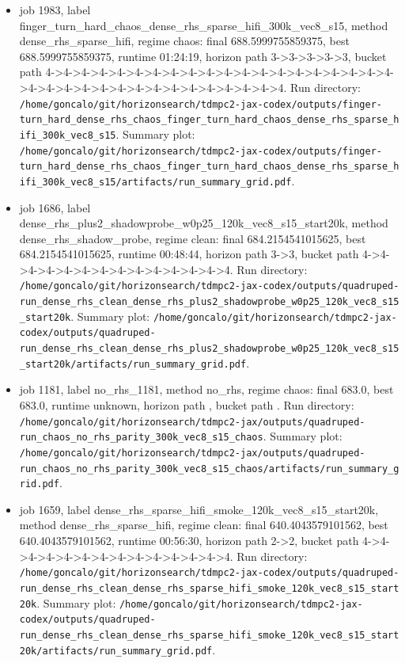 \begin{itemize}
\item job 1983, label finger\_turn\_hard\_chaos\_dense\_rhs\_sparse\_hifi\_300k\_vec8\_s15, method dense\_rhs\_sparse\_hifi, regime chaos: final 688.5999755859375, best 688.5999755859375, runtime 01:24:19, horizon path 3->3->3->3->3, bucket path 4->4->4->4->4->4->4->4->4->4->4->4->4->4->4->4->4->4->4->4->4->4->4->4->4->4->4->4->4->4->4->4->4->4->4. Run directory: \texttt{/home/goncalo/git/horizonsearch/tdmpc2-jax-codex/outputs/finger-turn\_hard\_dense\_rhs\_chaos\_finger\_turn\_hard\_chaos\_dense\_rhs\_sparse\_hifi\_300k\_vec8\_s15}. Summary plot: \texttt{/home/goncalo/git/horizonsearch/tdmpc2-jax-codex/outputs/finger-turn\_hard\_dense\_rhs\_chaos\_finger\_turn\_hard\_chaos\_dense\_rhs\_sparse\_hifi\_300k\_vec8\_s15/artifacts/run\_summary\_grid.pdf}.
\item job 1686, label dense\_rhs\_plus2\_shadowprobe\_w0p25\_120k\_vec8\_s15\_start20k, method dense\_rhs\_shadow\_probe, regime clean: final 684.2154541015625, best 684.2154541015625, runtime 00:48:44, horizon path 3->3, bucket path 4->4->4->4->4->4->4->4->4->4->4->4->4->4. Run directory: \texttt{/home/goncalo/git/horizonsearch/tdmpc2-jax-codex/outputs/quadruped-run\_dense\_rhs\_clean\_dense\_rhs\_plus2\_shadowprobe\_w0p25\_120k\_vec8\_s15\_start20k}. Summary plot: \texttt{/home/goncalo/git/horizonsearch/tdmpc2-jax-codex/outputs/quadruped-run\_dense\_rhs\_clean\_dense\_rhs\_plus2\_shadowprobe\_w0p25\_120k\_vec8\_s15\_start20k/artifacts/run\_summary\_grid.pdf}.
\item job 1181, label no\_rhs\_1181, method no\_rhs, regime chaos: final 683.0, best 683.0, runtime unknown, horizon path , bucket path . Run directory: \texttt{/home/goncalo/git/horizonsearch/tdmpc2-jax/outputs/quadruped-run\_chaos\_no\_rhs\_parity\_300k\_vec8\_s15\_chaos}. Summary plot: \texttt{/home/goncalo/git/horizonsearch/tdmpc2-jax/outputs/quadruped-run\_chaos\_no\_rhs\_parity\_300k\_vec8\_s15\_chaos/artifacts/run\_summary\_grid.pdf}.
\item job 1659, label dense\_rhs\_sparse\_hifi\_smoke\_120k\_vec8\_s15\_start20k, method dense\_rhs\_sparse\_hifi, regime clean: final 640.4043579101562, best 640.4043579101562, runtime 00:56:30, horizon path 2->2, bucket path 4->4->4->4->4->4->4->4->4->4->4->4->4->4. Run directory: \texttt{/home/goncalo/git/horizonsearch/tdmpc2-jax-codex/outputs/quadruped-run\_dense\_rhs\_clean\_dense\_rhs\_sparse\_hifi\_smoke\_120k\_vec8\_s15\_start20k}. Summary plot: \texttt{/home/goncalo/git/horizonsearch/tdmpc2-jax-codex/outputs/quadruped-run\_dense\_rhs\_clean\_dense\_rhs\_sparse\_hifi\_smoke\_120k\_vec8\_s15\_start20k/artifacts/run\_summary\_grid.pdf}.

\end{itemize}
